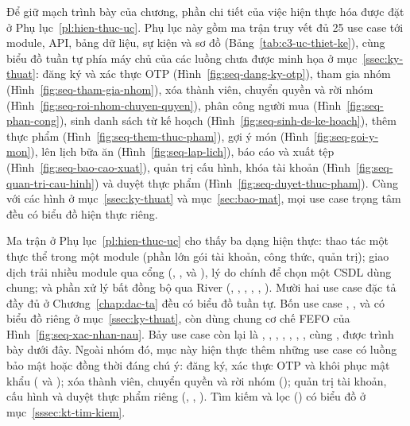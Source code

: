 Để giữ mạch trình bày của chương, phần chi tiết của việc hiện thực hóa được đặt ở Phụ lục~\ref{pl:hien-thuc-uc}. Phụ lục này gồm ma trận truy vết đủ 25 use case tới module, API, bảng dữ liệu, sự kiện và sơ đồ (Bảng~\ref{tab:c3-uc-thiet-ke}), cùng biểu đồ tuần tự phía máy chủ của các luồng chưa được minh họa ở mục~\ref{ssec:ky-thuat}: đăng ký và xác thực OTP (Hình~\ref{fig:seq-dang-ky-otp}), tham gia nhóm (Hình~\ref{fig:seq-tham-gia-nhom}), xóa thành viên, chuyển quyền và rời nhóm (Hình~\ref{fig:seq-roi-nhom-chuyen-quyen}), phân công người mua (Hình~\ref{fig:seq-phan-cong}), sinh danh sách từ kế hoạch (Hình~\ref{fig:seq-sinh-ds-ke-hoach}), thêm thực phẩm (Hình~\ref{fig:seq-them-thuc-pham}), gợi ý món (Hình~\ref{fig:seq-goi-y-mon}), lên lịch bữa ăn (Hình~\ref{fig:seq-lap-lich}), báo cáo và xuất tệp (Hình~\ref{fig:seq-bao-cao-xuat}), quản trị cấu hình, khóa tài khoản (Hình~\ref{fig:seq-quan-tri-cau-hinh}) và duyệt thực phẩm (Hình~\ref{fig:seq-duyet-thuc-pham}). Cùng với các hình ở mục~\ref{ssec:ky-thuat} và mục~\ref{sec:bao-mat}, mọi use case trọng tâm đều có biểu đồ hiện thực riêng.

Ma trận ở Phụ lục~\ref{pl:hien-thuc-uc} cho thấy ba dạng hiện thực: thao tác một thực thể trong một module (phần lớn gói tài khoản, công thức, quản trị); giao dịch trải nhiều module qua cổng (, ,  và ), lý do chính để chọn một CSDL dùng chung; và phần xử lý bất đồng bộ qua River (, , , , , ). Mười hai use case đặc tả đầy đủ ở Chương~\ref{chap:dac-ta} đều có biểu đồ tuần tự. Bốn use case , ,  và  có biểu đồ riêng ở mục~\ref{ssec:ky-thuat}, còn  dùng chung cơ chế FEFO của Hình~\ref{fig:seq-xac-nhan-nau}. Bảy use case còn lại là , , , , , , , cùng , được trình bày dưới đây. Ngoài nhóm đó, mục này hiện thực thêm những use case có luồng bảo mật hoặc đồng thời đáng chú ý: đăng ký, xác thực OTP và khôi phục mật khẩu ( và ); xóa thành viên, chuyển quyền và rời nhóm (); quản trị tài khoản, cấu hình và duyệt thực phẩm riêng (, , ). Tìm kiếm và lọc () có biểu đồ ở mục~\ref{sssec:kt-tim-kiem}.
